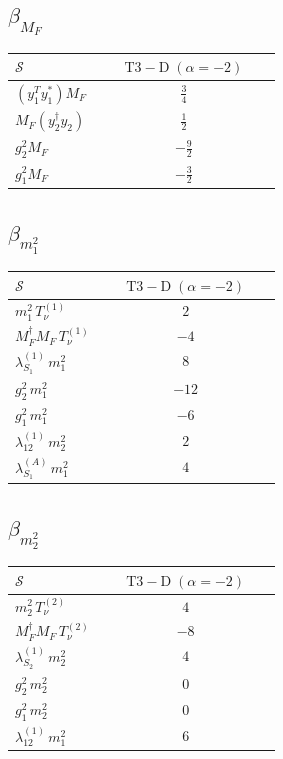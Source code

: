 \documentclass[9pt]{article}
\begin{document}
\subsection*{$ \beta_{M_F} $}
\begin{longtable}{@{}p{0.31\linewidth}c@{}}
\toprule
$\mathcal{S}$ & $ \mathrm{T3-D}\;(\alpha=-2) $ \\
\midrule
$ (y_1^T y_1^*)M_F $ & $ \frac{3}{4} $ \\
$ M_F(y_2^\dagger y_2) $ & $ \frac{1}{2} $ \\
$ g_2^2M_F $ & $ - \frac{9}{2} $ \\
$ g_1^2M_F $ & $ - \frac{3}{2} $ \\
\bottomrule
\end{longtable}
\subsection*{$ \beta_{m_1^{2}} $}
\begin{longtable}{@{}p{0.31\linewidth}c@{}}
\toprule
$\mathcal{S}$ & $ \mathrm{T3-D}\;(\alpha=-2) $ \\
\midrule
$ m_1^{2}\,T_{\nu}^{(1)} $ & $ 2 $ \\
$ M_F^\dagger M_F\,T_{\nu}^{(1)} $ & $ -4 $ \\
$ \lambda_{S_1}^{(1)}\,m_1^{2} $ & $ 8 $ \\
$ g_2^2\,m_1^{2} $ & $ -12 $ \\
$ g_1^2\,m_1^{2} $ & $ -6 $ \\
$ \lambda_{12}^{(1)}\,m_2^{2} $ & $ 2 $ \\
$ \lambda_{S_1}^{(A)}\,m_1^{2} $ & $ 4 $ \\
\bottomrule
\end{longtable}
\subsection*{$ \beta_{m_2^{2}} $}
\begin{longtable}{@{}p{0.31\linewidth}c@{}}
\toprule
$\mathcal{S}$ & $ \mathrm{T3-D}\;(\alpha=-2) $ \\
\midrule
$ m_2^{2}\,T_{\nu}^{(2)} $ & $ 4 $ \\
$ M_F^\dagger M_F\,T_{\nu}^{(2)} $ & $ -8 $ \\
$ \lambda_{S_2}^{(1)}\,m_2^{2} $ & $ 4 $ \\
$ g_2^2\,m_2^{2} $ & $ 0 $ \\
$ g_1^2\,m_2^{2} $ & $ 0 $ \\
$ \lambda_{12}^{(1)}\,m_1^{2} $ & $ 6 $ \\
\bottomrule
\end{longtable}
\end{document}
